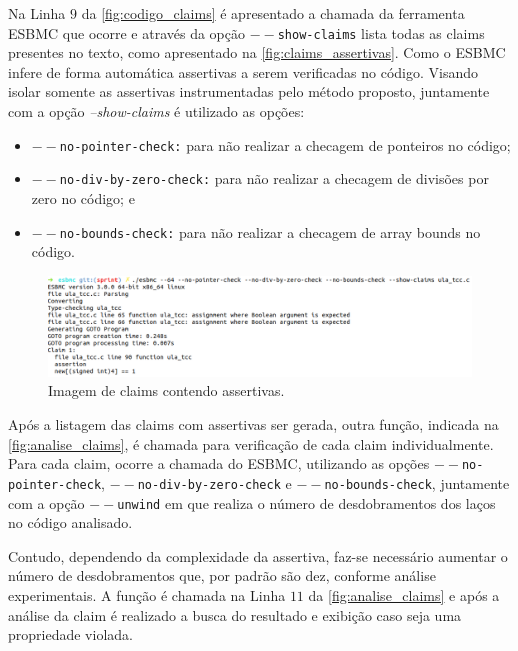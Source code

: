 \par
Na Linha $9$ da \autoref{fig:codigo_claims} é apresentado a chamada da ferramenta ESBMC que ocorre e através da opção \texttt{$--$show-claims} lista todas as claims presentes no texto, como apresentado na \autoref{fig:claims_assertivas}. Como o ESBMC infere de forma automática assertivas a serem verificadas no código. Visando isolar somente as assertivas instrumentadas pelo método proposto, juntamente com a opção \textit{--show-claims} é utilizado as opções:
\begin{itemize}
    \item \texttt{$--$no-pointer-check:} para não realizar a checagem de ponteiros no código;
    \item \texttt{$--$no-div-by-zero-check:} para não realizar a checagem de divisões por zero no código; e
    \item \texttt{$--$no-bounds-check:} para não realizar a checagem de array bounds no código.
\end{itemize}

\begin{figure}[H]
	\begin{center}
    \caption{\label{fig:claims_assertivas}Imagem de claims contendo assertivas.}
	\includegraphics[scale=0.55 ]{Figuras/lista_claim.png}
	\end{center}
\end{figure}

\par
Após a listagem das claims com assertivas ser gerada, outra função, indicada na \autoref{fig:analise_claims}, é chamada para verificação de cada claim individualmente. Para cada claim, ocorre a chamada do ESBMC, utilizando as opções \texttt{$--$no-pointer-check}, \texttt{$--$no-div-by-zero-check} e \texttt{$--$no-bounds-check}, juntamente com a opção \texttt{$--$unwind} em que realiza o número de desdobramentos dos laços no código analisado. 

\par
Contudo, dependendo da complexidade da assertiva, faz-se necessário aumentar o número de desdobramentos que, por padrão são dez, conforme análise experimentais. A função é chamada na Linha $11$ da \autoref{fig:analise_claims} e após a análise da claim é realizado a busca do resultado e exibição caso seja uma propriedade violada.

